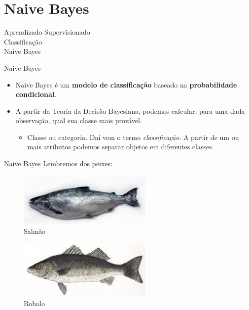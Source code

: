 \documentclass{libs/ufc_format}
\begin{document}
\section{Naive Bayes}

\begin{frame}{}
    \centering
    \LARGE
    Aprendizado Supervisionado\\
    \vspace{0.5cm}
    \LARGE
    Classificação\\
    \vspace{0.5cm}
    \Large
    Naive Bayes
\end{frame}

\begin{frame}{Naive Bayes}
    \begin{itemize}
        \justifying
        \item Naive Bayes é um \textbf{modelo de classificação} baseado na \textbf{probabilidade condicional}.
        \item A partir da Teoria da Decisão Bayesiana, podemos calcular, para uma dada observação, qual sua \alert<2>{classe} mais provável.
            \begin{itemize}
                \justifying
                \item<2> Classe ou categoria. Daí vem o termo \textit{classificação}. A partir de um ou mais atributos podemos separar objetos em diferentes classes.
            \end{itemize}
    \end{itemize}
\end{frame}

\begin{frame}{Naive Bayes}
    Lembremos dos peixes:\\
    \begin{figure}
        \centering
        \includegraphics[width=6.5cm]{media/salmon}
        \caption{Salmão}
        \label{fSalmao}
    \end{figure}
    \vspace{-0.5cm}
    \begin{figure}
        \centering
        \includegraphics[width=6.5cm]{media/seabass}
        \caption{Robalo}
        \label{fRobalo}
    \end{figure}    
\end{frame}
\end{document}

